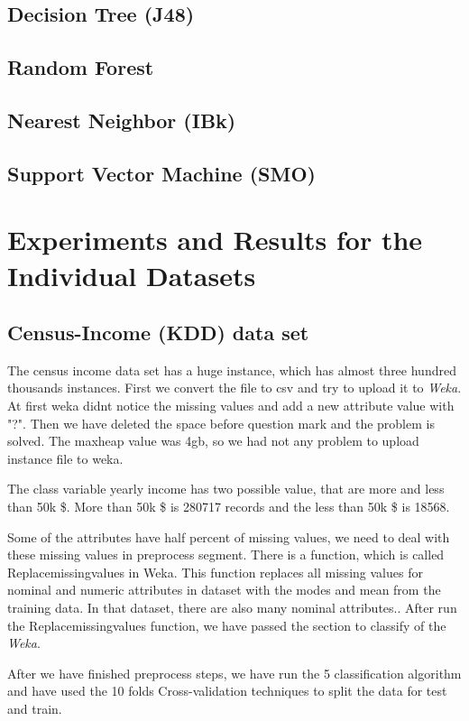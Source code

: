 \documentclass[a4paper]{article}
\begin{document}
    \subsection{ Decision Tree (J48)}
    \subsection{ Random Forest}
    \subsection{ Nearest Neighbor (IBk)}
    \subsection{ Support Vector Machine (SMO)}

\section{Experiments and Results for the Individual Datasets}

\subsection{Census-Income (KDD) data set}

The census income data set has a huge instance, which has almost three hundred thousands  instances. First we convert the file to csv and try to upload it to \emph{Weka}. At first weka didnt notice the missing values and add a new attribute value with "?". Then we have deleted the space before question mark and the problem is solved. The maxheap value was 4gb, so we had not any problem to upload instance file to weka. 

The class variable yearly income has two possible value, that are more and less than 50k \$. More than 50k \$ is 280717 records and the less than 50k \$ is 18568. 

Some of the attributes have half percent of missing values, we need to deal with these missing values in preprocess segment. There is a function, which is called Replacemissingvalues in Weka. This function replaces all missing values for nominal and numeric attributes in dataset with the modes and mean from the training data. In that dataset, there are also many nominal attributes.. After run the Replacemissingvalues function, we have passed the section to classify of the \emph{Weka}. 

After we have finished preprocess steps, we have run the 5 classification algorithm and have used the 10 folds Cross-validation techniques to split the data for test and train. 
\end{document}
